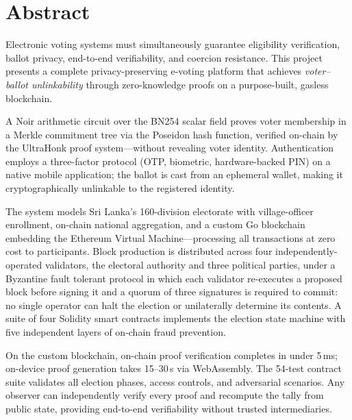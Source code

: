 
\chapter*{Abstract}

Electronic voting systems must simultaneously guarantee eligibility verification, ballot privacy, end-to-end verifiability, and coercion resistance. This project presents a complete privacy-preserving e-voting platform that achieves \textit{voter--ballot unlinkability} through zero-knowledge proofs on a purpose-built, gasless blockchain.

A Noir arithmetic circuit over the BN254 scalar field proves voter membership in a Merkle commitment tree via the Poseidon hash function, verified on-chain by the UltraHonk proof system---without revealing voter identity. Authentication employs a three-factor protocol (OTP, biometric, hardware-backed PIN) on a native mobile application; the ballot is cast from an ephemeral wallet, making it cryptographically unlinkable to the registered identity.

The system models Sri Lanka's 160-division electorate with village-officer enrollment, on-chain national aggregation, and a custom Go blockchain embedding the Ethereum Virtual Machine---processing all transactions at zero cost to participants. Block production is distributed across four independently-operated validators, the electoral authority and three political parties, under a Byzantine fault tolerant protocol in which each validator re-executes a proposed block before signing it and a quorum of three signatures is required to commit: no single operator can halt the election or unilaterally determine its contents. A suite of four Solidity smart contracts implements the election state machine with five independent layers of on-chain fraud prevention.

On the custom blockchain, on-chain proof verification completes in under 5\,ms; on-device proof generation takes 15--30\,s via WebAssembly. The 54-test contract suite validates all election phases, access controls, and adversarial scenarios. Any observer can independently verify every proof and recompute the tally from public state, providing end-to-end verifiability without trusted intermediaries.

